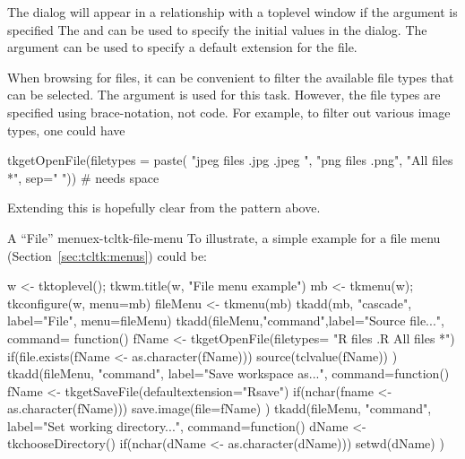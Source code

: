 The dialog will appear in a relationship with a toplevel window if the argument
 is specified The
 and
 can be used to specify the
initial values in the dialog.  The
 argument can be used to
specify a default extension for the file.

When browsing for files, it can be convenient to filter the available
file types that can be selected. The  argument is used for this task. However,
the file types are specified using \TCL\/ brace-notation, not \R\/ code. For example,
to filter out various image types, one could have 
\begin{Schunk}
\begin{Sinput}
 tkgetOpenFile(filetypes = paste(
                 "{{jpeg files} {.jpg .jpeg} }",
                 "{{png files} {.png}}",
                 "{{All files} {*}}", sep=" ")) # needs space
\end{Sinput}
\end{Schunk}
Extending this is hopefully clear from the pattern above.

\begin{example}{A ``File'' menu}{ex-tcltk-file-menu}
  To illustrate, a simple example for a file menu (Section~\ref{sec:tcltk:menus}) could be:
\begin{Schunk}
\begin{Sinput}
 w <- tktoplevel(); tkwm.title(w, "File menu example")
 mb <- tkmenu(w); tkconfigure(w, menu=mb)
 fileMenu <- tkmenu(mb)
 tkadd(mb, "cascade", label="File", menu=fileMenu)
 tkadd(fileMenu,"command",label="Source file...",
       command= function() {
         fName <- tkgetOpenFile(filetypes=
                         "{{R files} {.R}} {{All files} *}")
         if(file.exists(fName <- as.character(fName)))
            source(tclvalue(fName))
       })
 tkadd(fileMenu, "command", label="Save workspace as...",
       command=function() {
         fName <- tkgetSaveFile(defaultextension="Rsave")
         if(nchar(fname <- as.character(fName)))
           save.image(file=fName)
       })
 tkadd(fileMenu, "command", label="Set working directory...",
       command=function() {
         dName <- tkchooseDirectory()
         if(nchar(dName <- as.character(dName)))
           setwd(dName)
       })
\end{Sinput}
\end{Schunk}
\end{example}

